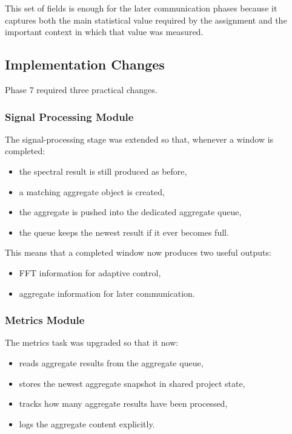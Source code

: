 \documentclass[12pt,a4paper]{article}
\begin{document}
This set of fields is enough for the later communication phases because it
captures both the main statistical value required by the assignment and the
important context in which that value was measured.

\subsection{Implementation Changes}

Phase 7 required three practical changes.

\subsubsection{Signal Processing Module}

The signal-processing stage was extended so that, whenever a window is
completed:

\begin{itemize}
    \item the spectral result is still produced as before,
    \item a matching aggregate object is created,
    \item the aggregate is pushed into the dedicated aggregate queue,
    \item the queue keeps the newest result if it ever becomes full.
\end{itemize}

This means that a completed window now produces two useful outputs:

\begin{itemize}
    \item FFT information for adaptive control,
    \item aggregate information for later communication.
\end{itemize}

\subsubsection{Metrics Module}

The metrics task was upgraded so that it now:

\begin{itemize}
    \item reads aggregate results from the aggregate queue,
    \item stores the newest aggregate snapshot in shared project state,
    \item tracks how many aggregate results have been processed,
    \item logs the aggregate content explicitly.
\end{itemize}
\end{document}

